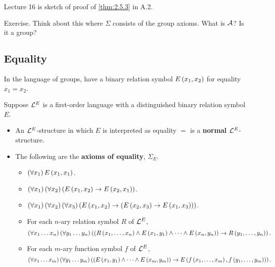 
Lecture 16 is sketch of proof of \ref{thm:2.5.3} in A.2.

\begin{example*}
Exercise. Think about this where $ \Sigma $ consists of the group axioms. What is $ \AA $? Is it a group?
\end{example*}


\subsection{Equality}

\begin{example*}
In the language of groups, have a binary relation symbol $ E\rb{x_1, x_2} $ for equality $ x_1 = x_2 $.
\end{example*}

\begin{definition}
Suppose $ \LL^E $ is a first-order language with a distinguished binary relation symbol $ E $.
\begin{itemize}
\item An $ \LL^E $-structure in which $ E $ is interpreted as equality $ = $ is a \textbf{normal} $ \LL^E $-structure.
\item The following are the \textbf{axioms of equality}, $ \Sigma_E $.
\begin{itemize}
\item $ \fab{x_1}E\rb{x_1, x_1} $.
\item $ \fab{x_1}\fab{x_2}\impb{E\rb{x_1, x_2}}{E\rb{x_2, x_1}} $.
\item $ \fab{x_1}\fab{x_2}\fab{x_3}\impb{E\rb{x_1, x_2}}{\impb{E\rb{x_2, x_3}}{E\rb{x_1, x_3}}} $.
\item For each $ n $-ary relation symbol $ R $ of $ \LL^E $,
$$ \fab{x_1 \dots x_n}\fab{y_1 \dots y_n}\impb{\rb{R\rb{x_1, \dots, x_n} \land E\rb{x_1, y_1} \land \dots \land E\rb{x_n, y_n}}}{R\rb{y_1, \dots, y_n}}. $$
\item For each $ m $-ary function symbol $ f $ of $ \LL^E $,
$$ \fab{x_1 \dots x_m}\fab{y_1 \dots y_m}\impb{\rb{E\rb{x_1, y_1} \land \dots \land E\rb{x_m, y_m}}}{E\rb{f\rb{x_1, \dots, x_m}, f\rb{y_1, \dots, y_m}}}. $$
\end{itemize}
\end{itemize}
\end{definition}

\pagebreak

